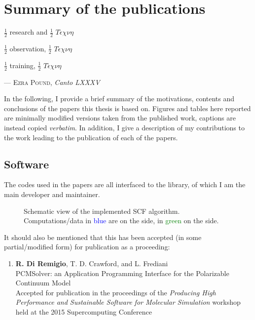 \chapter{Summary of the publications}\label{ch:publications-summary}

\epigraph{$\frac{1}{2}$ research and $\frac{1}{2}\,\,T\acute{\epsilon}\chi\nu\eta$

          $\frac{1}{2}$ observation, $\frac{1}{2}\,\,T\acute{\epsilon}\chi\nu\eta$

          $\frac{1}{2}$ training, $\frac{1}{2}\,\,T\acute{\epsilon}\chi\nu\eta$}{
  --- \textsc{Ezra Pound}, \textit{Canto LXXXV}}

In the following, I provide a brief summary of the motivations, contents and
conclusions of the papers this thesis is based on.
Figures and tables here reported are minimally modified versions taken from the published work,
captions are instead copied \emph{verbatim}.
In addition, I give a description of my contributions to the work leading to
the publication of each of the papers.

\pagebreak

\section*{Software}

The codes used in the papers are all interfaced to the \pcmsolver library,
of which I am the main developer and maintainer.

\begin{figure}[!htb]
\centering
\scalebox{0.8}{}
\caption[Modular approach to programming a \acs{PCM} functionality into an existing \acs{SCF} code.]{
  Schematic view of the implemented SCF algorithm. Computations/data in
  \textcolor{Blue}{blue} are on the \pcmsolver side, in
  \textcolor{Green}{green} on the \DIRAC side.
  }
\label{fig:algorithm}
\end{figure}

It should also be mentioned that this has been accepted (in some partial/modified form)
for publication as a proceeding:
\begin{enumerate}
\item
  \textbf{R. Di Remigio}, T. D. Crawford, and L. Frediani
  \\
  PCMSolver: an Application Programming Interface
  for the Polarizable Continuum Model
  \\
  Accepted for publication in the proceedings of the
  \emph{Producing High Performance and Sustainable Software for
  Molecular Simulation} workshop held at the 2015 Supercomputing
  Conference
\label{SC15}
\end{enumerate}

